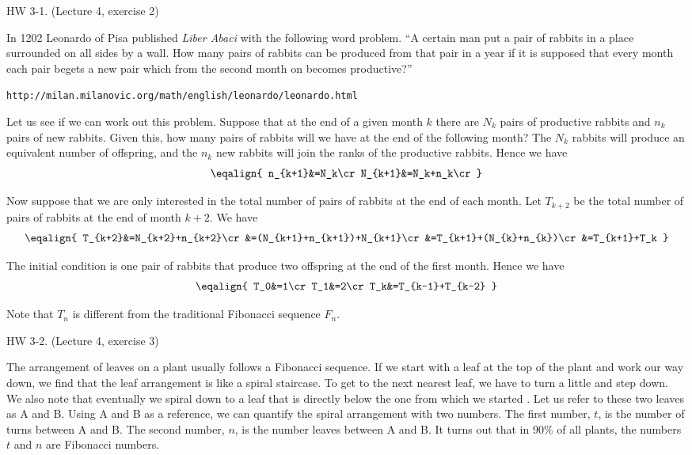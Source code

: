\beginsection HW 3-1. (Lecture 4, exercise 2)

In 1202 Leonardo of Pisa published {\it Liber Abaci} with the following word problem.
\medskip
``A certain man put a pair of rabbits in a place surrounded on all sides by a wall.
How many pairs of rabbits can be produced from that pair in a year if it is supposed
that every month each pair begets a new pair which from the second month on becomes
productive?''

{\tt http://milan.milanovic.org/math/english/leonardo/leonardo.html}

\medskip
Let us see if we can work out this problem.
Suppose that at the end of a given month $k$ there are
$N_k$ pairs of productive rabbits and $n_k$ pairs of new rabbits.
Given this, how many pairs of rabbits will we have at the end of
the following month?
The $N_k$ rabbits will produce an equivalent number of offspring,
and the $n_k$ new rabbits will join the ranks of the productive rabbits.
Hence we have
$$\eqalign{
n_{k+1}&=N_k\cr
N_{k+1}&=N_k+n_k\cr
}$$

Now suppose that we are only interested in the total number of pairs of rabbits
at the end of each month.
Let $T_{k+2}$ be the total number of pairs of rabbits at the end of month $k+2$.
We have
$$\eqalign{
T_{k+2}&=N_{k+2}+n_{k+2}\cr
&=(N_{k+1}+n_{k+1})+N_{k+1}\cr
&=T_{k+1}+(N_{k}+n_{k})\cr
&=T_{k+1}+T_k
}$$

The initial condition is one pair of rabbits that produce
two offspring at the end of the first month.
Hence we have
$$\eqalign{
T_0&=1\cr
T_1&=2\cr
T_k&=T_{k-1}+T_{k-2}
}$$

Note that $T_n$ is different from the traditional Fibonacci sequence $F_n$.

\vfill
\eject

\beginsection HW 3-2. (Lecture 4, exercise 3)

%
The arrangement of leaves on a plant usually follows a Fibonacci
sequence.
If we start with a leaf at the top of the plant and work our way down,
we find that the leaf arrangement is like a spiral staircase.
To get to the next nearest leaf, we have to turn a little and step down.
We also note that eventually we spiral down to a leaf that is directly
below the one from which we started   .
Let us refer to these two leaves as A and B.
Using A and B as a reference, we can quantify the spiral
arrangement with two numbers.
The first number, $t$, is the number of turns between
A and B.
The second number, $n$, is the number leaves between
A and B.
It turns out that in 90\% of all plants, the numbers $t$ and $n$
are Fibonacci numbers.

